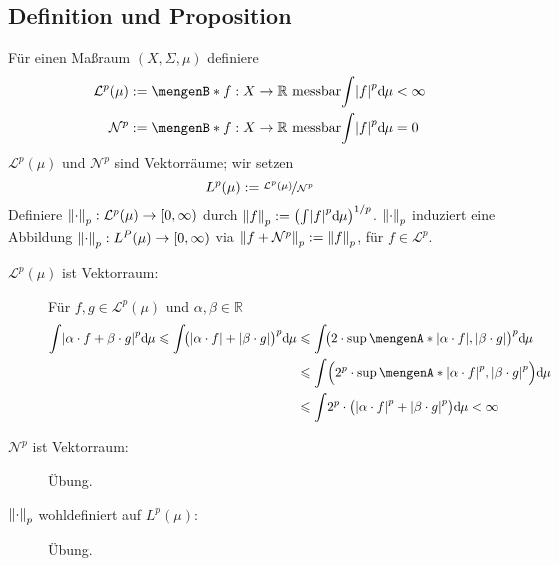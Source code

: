 \subsection[Definition und Proposition: Der Raum $L^p(\mu)$]{Definition und Proposition} %
\label{sub:43}
Für einen Maßraum $(X,\Sigma,\mu)$ definiere 
\begin{align*}
	\mathcal{L}^p(\mu) &:= \set[f : X \to \mathds{R} \text{ messbar}]{\int \abs*{f}^p \mathd \mu < \infty } \\
	\mathcal{N}^p &:= \set[f : X \to \mathds{R} \text{ messbar}]{\int \abs*{f}^p \mathd \mu = 0 } 
\end{align*}
$\mathcal{L}^p(\mu)$ und $\mathcal{N}^p$ sind Vektorräume; wir setzen 
\[
	L^p(\mu) := \nicefrac{\mathcal{L}^p(\mu)}{\mathcal{N}^p}
\]
Definiere $\norm[p]{\cdot } : \mathcal{L}^p(\mu) \to [0,\infty)$ durch $\norm[p]{f} := \enbrace*{\int \abs*{f}^p \mathd \mu }^{1/p}$. $\norm[p]{\cdot }$ induziert eine 
Abbildung $\norm[p]{\cdot } : L^P(\mu) \to [0,\infty) $ via $\norm[p]{f + \mathcal{N}^p} := \norm[p]{f} $, für $f \in \mathcal{L}^p$.
\begin{description}
	\item[$\mathcal{L}^p(\mu)$ ist Vektorraum:]  Für $f,g \in \mathcal{L}^p(\mu)$ und $\alpha, \beta \in \mathds{R}$
	\begin{align*}
		\int \abs*{\alpha \cdot f + \beta \cdot g}^p \mathd \mu \le \int \!\enbrace[\big]{\abs*{\alpha \cdot f} + \abs*{\beta \cdot g}}^p \mathd \mu
		&\le \int \!\enbrace[\big]{2 \cdot \sup \set{\abs*{\alpha \cdot f}, \abs*{\beta \cdot g}  } }^p \mathd \mu \\ 
		&\le \int \enbrace*{2^p \cdot \sup \set{\abs*{\alpha \cdot f}^p, \abs*{\beta \cdot g}^p  \rule{0cm}{1em}} } \mathd \mu \\ 
		&\le \int \!2^p \cdot  \enbrace[\big]{\abs*{\alpha \cdot f}^p + \abs*{\beta \cdot g}^p} \mathd \mu < \infty 
	\end{align*}
	\item[$\mathcal{N}^p$ ist Vektorraum:] Übung.
	\item[{$\norm[p]{\cdot}$ wohldefiniert auf $L^p(\mu)$:}] Übung. \bewende
\end{description}


